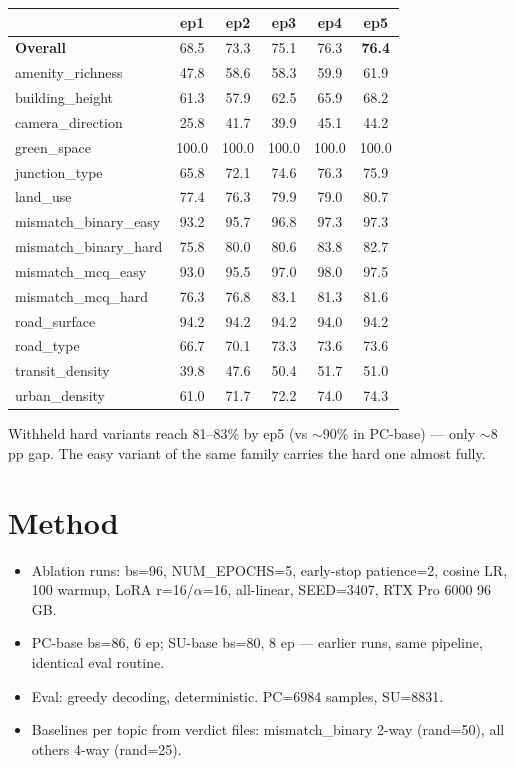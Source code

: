 \documentclass[11pt]{article}
\begin{document}
\begin{table}[h]\centering\scriptsize
\setlength{\tabcolsep}{6pt}
\begin{tabular}{l c c c c c}
\toprule
& ep1 & ep2 & ep3 & ep4 & ep5 \\
\midrule
\textbf{Overall}      & 68.5 & 73.3 & 75.1 & 76.3 & \textbf{76.4} \\
amenity\_richness     & 47.8 & 58.6 & 58.3 & 59.9 & 61.9 \\
building\_height      & 61.3 & 57.9 & 62.5 & 65.9 & 68.2 \\
camera\_direction     & 25.8 & 41.7 & 39.9 & 45.1 & 44.2 \\
green\_space          & 100.0 & 100.0 & 100.0 & 100.0 & 100.0 \\
junction\_type        & 65.8 & 72.1 & 74.6 & 76.3 & 75.9 \\
land\_use             & 77.4 & 76.3 & 79.9 & 79.0 & 80.7 \\
mismatch\_binary\_easy& 93.2 & 95.7 & 96.8 & 97.3 & 97.3 \\
mismatch\_binary\_hard& 75.8 & 80.0 & 80.6 & 83.8 & 82.7 \\
mismatch\_mcq\_easy   & 93.0 & 95.5 & 97.0 & 98.0 & 97.5 \\
mismatch\_mcq\_hard   & 76.3 & 76.8 & 83.1 & 81.3 & 81.6 \\
road\_surface         & 94.2 & 94.2 & 94.2 & 94.0 & 94.2 \\
road\_type            & 66.7 & 70.1 & 73.3 & 73.6 & 73.6 \\
transit\_density      & 39.8 & 47.6 & 50.4 & 51.7 & 51.0 \\
urban\_density        & 61.0 & 71.7 & 72.2 & 74.0 & 74.3 \\
\bottomrule
\end{tabular}
\end{table}

Withheld hard variants reach 81--83\% by ep5 (vs $\sim$90\% in PC-base) --- only $\sim$8 pp gap. The easy variant of the same family carries the hard one almost fully.

\section{Method}

\begin{itemize}\itemsep1pt
\item Ablation runs: bs=96, NUM\_EPOCHS=5, early-stop patience=2, cosine LR, 100 warmup, LoRA r=16/$\alpha$=16, all-linear, SEED=3407, RTX Pro 6000 96 GB.
\item PC-base bs=86, 6 ep; SU-base bs=80, 8 ep --- earlier runs, same pipeline, identical eval routine.
\item Eval: greedy decoding, deterministic. PC=6984 samples, SU=8831.
\item Baselines per topic from verdict files: mismatch\_binary 2-way (rand=50), all others 4-way (rand=25).
\end{itemize}
\end{document}
